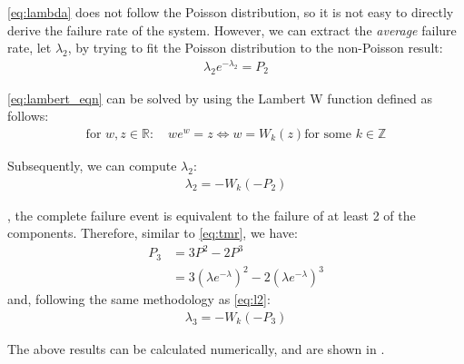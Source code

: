 \documentclass[a4paper,nobib]{tufte-book}
\begin{document}
%
		
\eqref{eq:lambda} does not follow the Poisson distribution, so it is not easy to directly derive the failure rate of the system. However, we can extract the \emph{average} failure rate, let \( \lambda_2 \), by trying to fit the Poisson distribution to the non-Poisson result:
		\begin{align}
		\lambda_2e^{-\lambda_2} = P_2 \label{eq:lambert_eqn}
		\end{align}
		
	\eqref{eq:lambert_eqn} can be solved by using the Lambert W function \autocite{weisstein_lambert_wfunction} defined as follows:
\begin{align}
	\text{for } w,z \in \mathbb R:\quad we^w = z \iff w = W_k(z) \text{for some } k \in \mathbb Z
\end{align}
		
Subsequently, we can compute \(\lambda_2\):
\begin{align}
	\lambda_2 = -W_k(-P_2)
	\label{eq:l2}
\end{align}


, the complete failure event is equivalent to the failure of at least 2 of the components. Therefore, similar to \eqref{eq:tmr}, we have:
\begin{align}
P_3 &= 3P^2 - 2P^3 \nonumber\\
&= 3\left(\lambda e^{-\lambda}\right)^2 - 2\left(\lambda e^{-\lambda}\right)^3
\end{align}
and, following the same methodology as \eqref{eq:l2}:
\begin{align}
\lambda_3 = -W_k(-P_3)
\label{eq:l3}
\end{align}

The above results can be calculated numerically, and are shown in .
\end{document}
